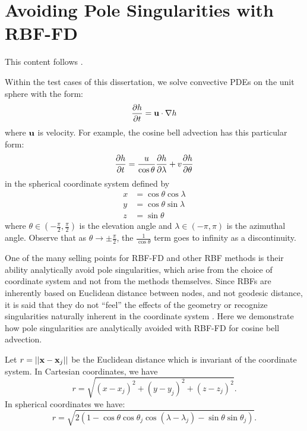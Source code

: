 %
% 
%
%

\chapter{Avoiding Pole Singularities with RBF-FD}
This content follows \cite{FlyerWright07,FlyerWright09}. 

Within the test cases of this dissertation, we solve convective PDEs on the unit sphere with the form: 
$$
\frac{\partial h}{\partial t} = \mathbf{u} \cdot \nabla h
$$
where $\mathbf{u}$ is velocity. For example, the cosine bell advection has this particular form:
\begin{equation}
\frac{\partial h}{\partial t} = \frac{u}{\cos{\theta}} \frac{\partial h}{\partial \lambda} + v \frac{\partial h}{\partial \theta} \label{eq:cosine_bell_appendix}
\end{equation}
in the spherical coordinate system defined by
\begin{align*}
x & = \cos{\theta}\cos{\lambda} \\
y & = \cos{\theta}\sin{\lambda} \\
z & = \sin{\theta}
\end{align*}
where $\theta \in (-\frac{\pi}{2}, \frac{\pi}{2})$ is the elevation angle and $\lambda \in (-\pi,\pi)$ is the azimuthal angle.
Observe that as $\theta \rightarrow \pm \frac{\pi}{2}$, the $\frac{1}{\cos{\theta}}$ term goes to infinity as a discontinuity. 

One of the many selling points for RBF-FD and other RBF methods is their ability analytically avoid pole singularities, which arise from the choice of coordinate system and not from the methods themselves. Since RBFs are inherently based on Euclidean distance between nodes, and not geodesic distance, it is said that they do not ``feel'' the effects of the geometry or recognize singularities naturally inherent in the coordinate system \cite{FlyerWright07}. 
Here we demonstrate how pole singularities are analytically avoided with RBF-FD for cosine bell advection.  


Let $r = || \mathbf{x} - \mathbf{x}_j ||$ be the Euclidean distance which is invariant of the coordinate system. In Cartesian coordinates, we have
$$
r = \sqrt{(x-x_j)^2 + (y-y_j)^2 + (z-z_j)^2}.
$$
In spherical coordinates we have:
$$
r = \sqrt{2(1-\cos{\theta}\cos{\theta_j}\cos{(\lambda-\lambda_j)} - \sin{\theta}\sin{\theta_j})}.
$$


